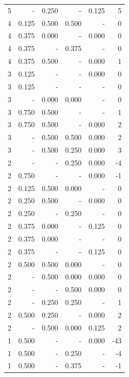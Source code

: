 \documentclass[a4paper]{article}\usepackage[]{graphicx}\usepackage[]{color}
\begin{document}
\begin{table}[ht]
\begin{tabular}{rrrrrr}
  5 & - & 0.250 & - & 0.125 & 5 \\ 
   \rowcolor{goodColor} 4 & 0.125 & 0.500 & 0.500 & - & 0 \\ 
  4 & 0.375 & 0.000 & - & 0.000 & 0 \\ 
   \rowcolor{sosoColor} 4 & 0.375 & - & 0.375 & - & 0 \\ 
  4 & 0.375 & 0.500 & - & 0.000 & 1 \\ 
   \rowcolor{nullColor} 3 & 0.125 & - & - & 0.000 & 0 \\ 
   \rowcolor{nullColor} 3 & 0.125 & - & - & - & 0 \\ 
   \rowcolor{goodColor} 3 & - & 0.000 & 0.000 & - & 0 \\ 
  3 & 0.750 & 0.500 & - & - & 1 \\ 
  3 & 0.750 & 0.500 & - & 0.000 & 2 \\ 
   \rowcolor{goodColor} 3 & - & 0.500 & 0.500 & 0.000 & 2 \\ 
   \rowcolor{badColor} 3 & - & 0.500 & 0.250 & 0.000 & 3 \\ 
   \rowcolor{sosoColor} 2 & - & - & 0.250 & 0.000 & -4 \\ 
   \rowcolor{nullColor} 2 & 0.750 & - & - & 0.000 & -1 \\ 
   \rowcolor{badColor} 2 & 0.125 & 0.500 & 0.000 & - & 0 \\ 
  2 & 0.250 & 0.500 & - & 0.000 & 0 \\ 
   \rowcolor{sosoColor} 2 & 0.250 & - & 0.250 & - & 0 \\ 
  2 & 0.375 & 0.000 & - & 0.125 & 0 \\ 
  2 & 0.375 & 0.000 & - & - & 0 \\ 
   \rowcolor{nullColor} 2 & 0.375 & - & - & 0.125 & 0 \\ 
   \rowcolor{badColor} 2 & 0.500 & 0.500 & 0.000 & - & 0 \\ 
   \rowcolor{badColor} 2 & - & 0.500 & 0.000 & 0.000 & 0 \\ 
   \rowcolor{sosoColor} 2 & - & - & 0.500 & 0.000 & 0 \\ 
   \rowcolor{goodColor} 2 & - & 0.250 & 0.250 & - & 1 \\ 
  2 & 0.500 & 0.250 & - & 0.000 & 2 \\ 
   \rowcolor{badColor} 2 & - & 0.500 & 0.000 & 0.125 & 2 \\ 
   \rowcolor{nullColor} 1 & 0.500 & - & - & 0.000 & -43 \\ 
   \rowcolor{sosoColor} 1 & 0.500 & - & 0.250 & - & -4 \\ 
   \rowcolor{sosoColor} 1 & 0.500 & - & 0.375 & - & -1 \\ 

\end{tabular}
\end{table}
\end{document}

